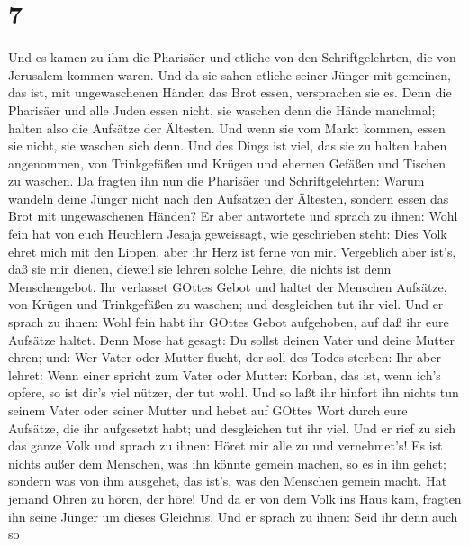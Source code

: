 \hypertarget{section-6}{%
\section{7}\label{section-6}}

 Und es kamen zu ihm die Pharisäer und etliche von den
Schriftgelehrten, die von Jerusalem kommen waren.  Und da
sie sahen etliche seiner Jünger mit gemeinen, das ist, mit ungewaschenen
Händen das Brot essen, versprachen sie es.  Denn die
Pharisäer und alle Juden essen nicht, sie waschen denn die Hände
manchmal; halten also die Aufsätze der Ältesten.  Und wenn
sie vom Markt kommen, essen sie nicht, sie waschen sich denn. Und des
Dings ist viel, das sie zu halten haben angenommen, von Trinkgefäßen und
Krügen und ehernen Gefäßen und Tischen zu waschen.  Da
fragten ihn nun die Pharisäer und Schriftgelehrten: Warum wandeln deine
Jünger nicht nach den Aufsätzen der Ältesten, sondern essen das Brot mit
ungewaschenen Händen?  Er aber antwortete und sprach zu
ihnen: Wohl fein hat von euch Heuchlern Jesaja geweissagt, wie
geschrieben steht: Dies Volk ehret mich mit den Lippen, aber ihr Herz
ist ferne von mir.  Vergeblich aber ist's, daß sie mir
dienen, dieweil sie lehren solche Lehre, die nichts ist denn
Menschengebot.  Ihr verlasset GOttes Gebot und haltet der
Menschen Aufsätze, von Krügen und Trinkgefäßen zu waschen; und
desgleichen tut ihr viel.  Und er sprach zu ihnen: Wohl fein
habt ihr GOttes Gebot aufgehoben, auf daß ihr eure Aufsätze haltet.
 Denn Mose hat gesagt: Du sollst deinen Vater und deine
Mutter ehren; und: Wer Vater oder Mutter flucht, der soll des Todes
sterben:  Ihr aber lehret: Wenn einer spricht zum Vater
oder Mutter: Korban, das ist, wenn ich's opfere, so ist dir's viel
nützer, der tut wohl.  Und so laßt ihr hinfort ihn nichts
tun seinem Vater oder seiner Mutter  und hebet auf GOttes
Wort durch eure Aufsätze, die ihr aufgesetzt habt; und desgleichen tut
ihr viel.  Und er rief zu sich das ganze Volk und sprach zu
ihnen: Höret mir alle zu und vernehmet's!  Es ist nichts
außer dem Menschen, was ihn könnte gemein machen, so es in ihn gehet;
sondern was von ihm ausgehet, das ist's, was den Menschen gemein macht.
 Hat jemand Ohren zu hören, der höre!  Und da
er von dem Volk ins Haus kam, fragten ihn seine Jünger um dieses
Gleichnis.  Und er sprach zu ihnen: Seid ihr denn auch so

